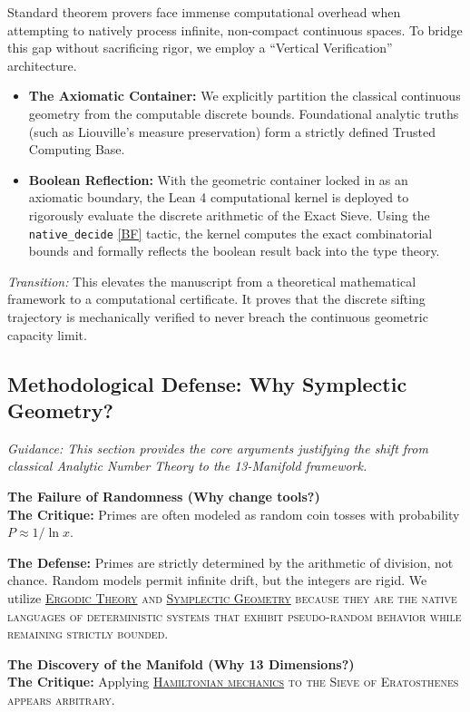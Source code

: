 \documentclass[sn-mathphys-num, pdflatex]{sn-jnl}
\newcommand{\gterm}[2]{\begingroup\normalfont\scshape\hyperlink{#1}{#2}\endgroup}
\begin{document}
    Standard theorem provers face immense computational overhead when attempting to natively process infinite, non-compact continuous spaces. To bridge this gap without sacrificing rigor, we employ a ``Vertical Verification'' architecture. 

\begin{itemize}
    \item \textbf{The Axiomatic Container:} We explicitly partition the classical continuous geometry from the computable discrete bounds. Foundational analytic truths (such as Liouville's measure preservation) form a strictly defined Trusted Computing Base. 
    \item \textbf{Boolean Reflection:} With the geometric container locked in as an axiomatic boundary, the Lean 4 computational kernel is deployed to rigorously evaluate the discrete arithmetic of the Exact Sieve. Using the \texttt{native\_decide} \ref{BF} tactic, the kernel computes the exact combinatorial bounds and formally reflects the boolean result back into the type theory. 
\end{itemize}

\textit{Transition:} This elevates the manuscript from a theoretical mathematical framework to a computational certificate. It proves that the discrete sifting trajectory is mechanically verified to never breach the continuous geometric capacity limit.


\subsection{Methodological Defense: Why Symplectic Geometry?}

\textit{Guidance: This section provides the core arguments justifying the shift from classical Analytic Number Theory to the 13-Manifold framework.}

\noindent \textbf{The Failure of Randomness (Why change tools?)} \\
\noindent \textbf{The Critique:} Primes are often modeled as random coin tosses with probability $P \approx 1/\ln x$. 

\textbf{The Defense:} Primes are strictly determined by the arithmetic of division, not chance. Random models permit infinite drift, but the integers are rigid. We utilize \gterm{ergodic}{Ergodic Theory} and \gterm{geometry}{Symplectic Geometry} because they are the native languages of deterministic systems that exhibit pseudo-random behavior while remaining strictly bounded.

\noindent \textbf{The Discovery of the Manifold (Why 13 Dimensions?)} \\
\textbf{The Critique:} Applying \gterm{hamiltonian}{Hamiltonian mechanics} to the Sieve of Eratosthenes appears arbitrary.
\end{document}
